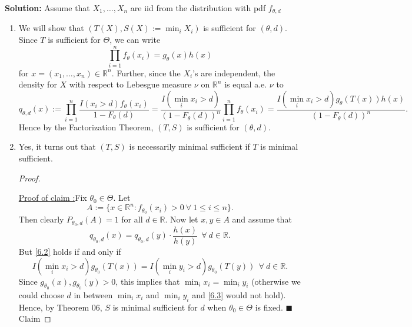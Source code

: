 \documentclass[12pt]{article}
\newcounter{ProofCounter}
\newcounter{ClaimCounter}[ProofCounter]
\newenvironment{claim}[1]{\vspace{1mm}\stepcounter{ClaimCounter}\par\noindent\underline{\bf Claim \theClaimCounter:}\space#1}{}
\newenvironment{claimproof}[1]{\par\noindent\underline{Proof of claim \theClaimCounter:}\space#1}{\hfill $\blacksquare$ Claim \theClaimCounter}
\begin{document}
{\bf Solution:}
Assume that $X_{1}, \dots, X_{n}$ are iid from the distribution with pdf $f_{\theta, d}$
\begin{enumerate}[label=(\alph*)]
  \item We will show that $(T(X), S(X) := \min_{i} X_{i})$ is sufficient for $(\theta, d)$. Since $T$ is sufficient for $\Theta$, we can write
    \begin{equation}
      \prod_{i=1}^{n}f_{\theta}(x_{i}) = g_{\theta}(x)h(x)
      \label{6.0}
    \end{equation}
    for $x = (x_{1}, \dots, x_{n}) \in \mathbb{R}^{n}$. Further,
    since the $X_{i}$'s are independent, the density for $X$
    with respect to Lebesgue measure $\nu$ on $\mathbb{R}^{n}$ is equal a.e. $\nu$ to 
    \begin{equation}
      q_{\theta, d}(x) := \prod_{i=1}^{n}\frac{I(x_{i} > d)f_{\theta}(x_{i})}{1 - F_{\theta}(d)} = \frac{I(\min_{i}x_{i} > d)}{(1 - F_{\theta}(d))^{n}}
    \prod_{i=1}^{n}f_{\theta}(x_{i}) = \frac{I(\min_{i} x_{i} > d)g_{\theta}(T(x))h(x)}{(1 - F_{\theta}(d))^{n}}. 
    \label{6.1}
    \end{equation}
    Hence by the Factorization Theorem, $(T, S)$ is sufficient for $(\theta, d)$.

  \item Yes, it turns out that $(T, S)$ is necessarily minimal sufficient if $T$ is minimal sufficient. 
    \begin{proof} 
      $ $
      \begin{claimproof}
        Fix $\theta_0 \in \Theta$.
        Let 
        \[
          A := \{x \in \mathbb{R}^{n} : f_{\theta_0}(x_{i}) > 0 \ \forall \ 1 \leq i \leq n \}.
        \]
        Then clearly $P_{\theta_0,d}(A) = 1$ for all $d \in \mathbb{R}$.
        Now let $x,y \in A$ and assume that
        \begin{equation}
          q_{\theta_0,d}(x) = q_{\theta_0,d}(y)\cdot \frac{h(x)}{h(y)} \ \ \forall \ d \in \mathbb{R}.
          \label{6.2}
        \end{equation}
        But \eqref{6.2} holds if and only if 
        \begin{equation}
          I(\min_{i} x_{i} > d)g_{\theta_0}(T(x)) = I(\min_{i}y_{i} > d)g_{\theta_0}(T(y)) \ \ \forall \ d \in \mathbb{R}.
          \label{6.3}
        \end{equation}
        Since $g_{\theta_0}(x), g_{\theta_0}(y) > 0$, this implies that $\min_{i} x_{i} = \min_{i}y_{i}$ (otherwise we could choose $d$ in between $\min_{i}
        x_{i}$ and $\min_{i} y_{i}$ and \eqref{6.3} would not hold). Hence, by Theorem 06, $S$ is minimal sufficient for $d$ when $\theta_0 \in \Theta$ is fixed.
      \end{claimproof}


\end{proof}
\end{enumerate}
\end{document}
